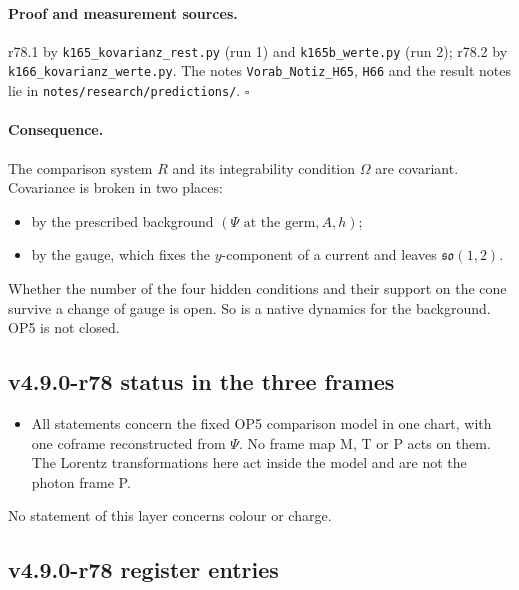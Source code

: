 \paragraph{Proof and measurement sources.}
r78.1 by \texttt{k165\_kovarianz\_rest.py} (run 1) and \texttt{k165b\_werte.py} (run 2); r78.2 by
\texttt{k166\_kovarianz\_werte.py}.  The notes \texttt{Vorab\_\allowbreak Notiz\_\allowbreak H65}, \texttt{H66} and the
result notes lie in \texttt{notes/\allowbreak research/\allowbreak predictions/}.  \(\square\)

\paragraph{Consequence.}
The comparison system \(R\) and its integrability condition \(\Omega\) are covariant.  Covariance is broken in two places:
\begin{itemize}[leftmargin=2em]
\item by the prescribed background \((\Psi\text{ at the germ},A,h)\);
\item by the gauge, which fixes the \(y\)-component of a current and leaves \(\mathfrak{so}(1,2)\).
\end{itemize}
Whether the number of the four hidden conditions and their support on the cone survive a change of gauge is open.  So is a
native dynamics for the background.  OP5 is not closed.

\subsection*{v4.9.0-r78 status in the three frames}
\label{subsec:v490-r78-frames}

\begin{itemize}[leftmargin=2em]
\item All statements concern the fixed OP5 comparison model in one chart, with one coframe reconstructed from \(\Psi\).  No
frame map M, T or P acts on them.  The Lorentz transformations here act inside the model and are not the photon frame P.
\end{itemize}
No statement of this layer concerns colour or charge.

\subsection*{v4.9.0-r78 register entries}
\label{subsec:v490-r78-register}

